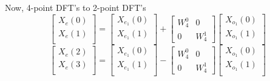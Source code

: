\documentclass[journal,12pt,twocolumn]{IEEEtran}
\renewcommand\thesection{\arabic{section}}
\begin{document}
\begin{enumerate}[label=\thesection.\arabic*.,ref=\thesection.\theenumi]
Now, 4-point DFT's to 2-point DFT's
\begin{equation}
\begin{bmatrix}
X_{e}(0) \\ 
X_{e}(1)\\ 
\end{bmatrix}
=
\begin{bmatrix}
X_{e_{1}}(0) \\ 
X_{e_{1}}(1)\\ 
\end{bmatrix}
+
\begin{bmatrix}
W^{0}_{4} & 0\\
0 & W^{1}_{4}
\end{bmatrix}
\begin{bmatrix}
X_{o_{1}}(0) \\ 
X_{o_{1}}(1) \\ 
\end{bmatrix}
\end{equation}
\begin{equation}
\begin{bmatrix}
X_{e}(2) \\ 
X_{e}(3)\\ 
\end{bmatrix}
=
\begin{bmatrix}
X_{e_{1}}(0) \\ 
X_{e_{1}}(1)\\ 
\end{bmatrix}
-
\begin{bmatrix}
W^{0}_{4} & 0\\
0 & W^{1}_{4}
\end{bmatrix}
\begin{bmatrix}
X_{o_{1}}(0) \\ 
X_{o_{1}}(1) \\ 
\end{bmatrix}
\end{equation}


\end{enumerate}
\end{document}
